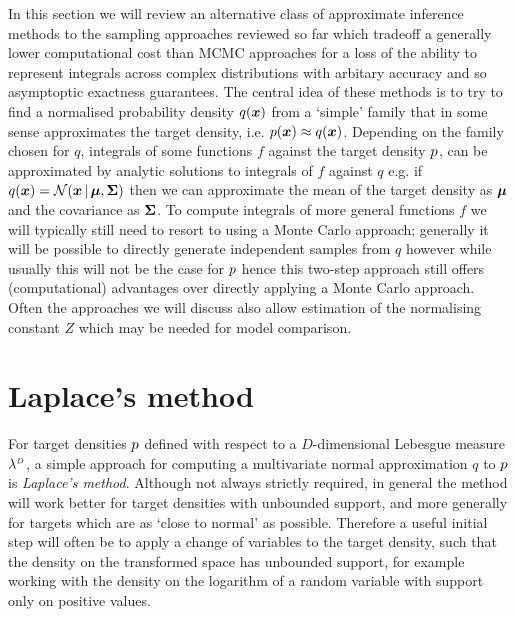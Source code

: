 In this section we will review an alternative class of approximate inference methods to the sampling approaches reviewed so far which tradeoff a generally lower computational cost than \ac{MCMC} approaches for a loss of the ability to represent integrals across complex distributions with arbitary accuracy and so asymptoptic exactness guarantees. The central idea of these methods is to try to find a normalised probability density $q(\boldsymbol{x})$ from a `simple' family that in some sense approximates the target density, i.e. $p(\boldsymbol{x}) \approx q(\boldsymbol{x})$. Depending on the family chosen for $q$, integrals of some functions $f$ against the target density $p$, can be approximated by analytic solutions to integrals of $f$ against $q$ e.g. if $q(\vct{x}) = \nrm{\vct{x} \gvn \vct{\mu},\mtx{\Sigma}}$ then we can approximate the mean of the target density as $\boldsymbol{\mu}$ and the covariance as $\boldsymbol{\Sigma}$. To compute integrals of more general functions $f$ we will typically still need to resort to using a Monte Carlo approach; generally it will be possible to directly generate independent samples from $q$ however while usually this will not be the case for $p$ hence this two-step approach still offers (computational) advantages over directly applying a Monte Carlo approach. Often the approaches we will discuss also allow estimation of the normalising constant $Z$ which may be needed for model comparison.

\section{Laplace's method}

For target densities $p$ defined with respect to a $D$-dimensional Lebesgue measure $\lebm{D}$, a simple approach for computing a multivariate normal approximation  $q$ to $p$ is \emph{Laplace's method}. Although not always strictly required, in general the method will work better for target densities with unbounded support, and more generally for targets which are as `close to normal' as possible. Therefore a useful initial step will often be to apply a change of variables to the target density, such that the density on the transformed space has unbounded support, for example working with the density on the logarithm of a random variable with support only on positive values.

